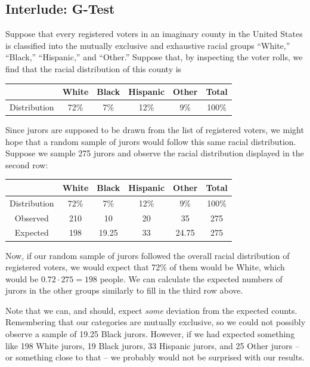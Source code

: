 \documentclass[letterpaper]{article}
\begin{document}
\subsection{Interlude: G-Test}
Suppose that every registered voters in an imaginary county in the United States is classified into the mutually exclusive and exhaustive racial groups ``White,'' ``Black,'' ``Hispanic,'' and ``Other.'' Suppose that, by inspecting the voter rolls, we find that the racial distribution of this county is 
\begin{center}
    \begin{tabular}{c|c c c c c}
            & White & Black & Hispanic & Other & Total \\
        \hline  
        Distribution & 72\% & 7\% & 12\% & 9\% & 100\%
    \end{tabular}
\end{center}
Since jurors are supposed to be drawn from the list of registered voters, we might hope that a random sample of jurors would follow this same racial distribution. Suppose we sample 275 jurors and observe the racial distribution displayed in the second row:
\begin{center}
    \begin{tabular}{c|c c c c c}
            & White & Black & Hispanic & Other & Total \\
        \hline  
        Distribution & 72\% & 7\% & 12\% & 9\% & 100\% \\ 
        Observed & 210 & 10 & 20 & 35 & 275 \\ 
        Expected & 198 & 19.25 & 33 & 24.75 & 275
    \end{tabular}
\end{center}
Now, if our random sample of jurors followed the overall racial distribution of registered voters, we would expect that 72\% of them would be White, which would be $0.72 \cdot 275 = 198$ people. We can calculate the expected numbers of jurors in the other groups similarly to fill in the third row above.

\bigskip 

Note that we can, and should, expect \emph{some} deviation from the expected counts. Remembering that our categories are mutually exclusive, so we could not possibly observe a sample of 19.25 Black jurors. However, if we had expected something like 198 White jurors, 19 Black jurors, 33 Hispanic jurors, and 25 Other jurors -- or something close to that -- we probably would not be surprised with our results.
\end{document}
